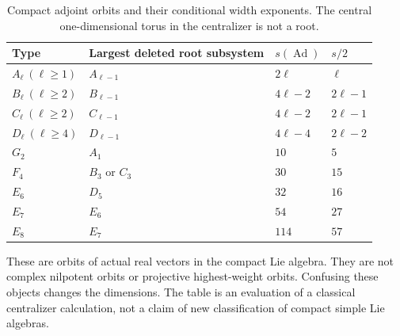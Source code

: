 \begin{table}[ht]
\centering
\caption{Compact adjoint orbits and their conditional width exponents.
The central one-dimensional torus in the centralizer is not a root.}
\label{tab:adjoint41}
\begin{tabular}{llll}
\toprule
Type & Largest deleted root subsystem & $s(\operatorname{Ad})$ & $s/2$\\
\midrule
$A_\ell\ (\ell\ge1)$ & $A_{\ell-1}$ & $2\ell$ & $\ell$\\
$B_\ell\ (\ell\ge2)$ & $B_{\ell-1}$ & $4\ell-2$ & $2\ell-1$\\
$C_\ell\ (\ell\ge2)$ & $C_{\ell-1}$ & $4\ell-2$ & $2\ell-1$\\
$D_\ell\ (\ell\ge4)$ & $D_{\ell-1}$ & $4\ell-4$ & $2\ell-2$\\
$G_2$ & $A_1$ & $10$ & $5$\\
$F_4$ & $B_3$ or $C_3$ & $30$ & $15$\\
$E_6$ & $D_5$ & $32$ & $16$\\
$E_7$ & $E_6$ & $54$ & $27$\\
$E_8$ & $E_7$ & $114$ & $57$\\
\bottomrule
\end{tabular}
\end{table}
These are orbits of actual real vectors in the compact Lie algebra.
They are not complex nilpotent orbits or projective highest-weight
orbits. Confusing these objects changes the dimensions. The table is
an evaluation of a classical centralizer calculation, not a claim of
new classification of compact simple Lie algebras.


